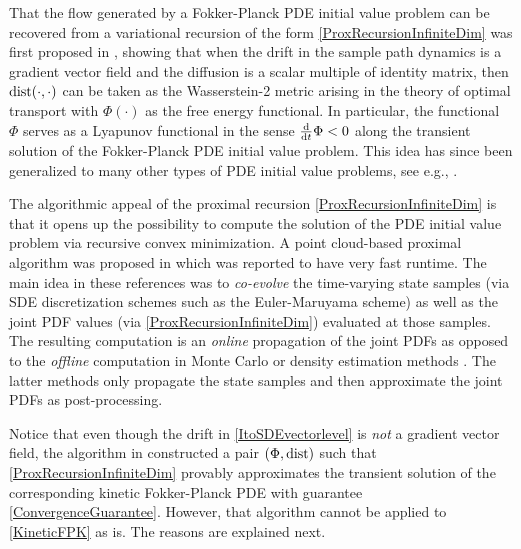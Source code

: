 \documentclass[10pt,twocolumn]{IEEEtran}
\newcommand{\differential}{{\rm{d}}}
\begin{document}
That the flow generated by a Fokker-Planck PDE initial value problem can be recovered from a variational recursion of the form \eqref{ProxRecursionInfiniteDim} was first proposed in \cite{jordan1998variational}, showing that when the drift in the sample path dynamics is a gradient vector field and the diffusion is a scalar multiple of identity matrix, then ${\rm{dist}}(\cdot,\cdot)$ can be taken as the Wasserstein-2 metric arising in the theory of optimal transport \cite{villani2003topics} with $\Phi(\cdot)$ as the free energy functional. In particular, the functional $\Phi$ serves as a Lyapunov functional in the sense $\frac{\differential}{\differential t}\Phi < 0$ along the transient solution of the Fokker-Planck PDE initial value problem. This idea has since been generalized to many other types of PDE initial value problems, see e.g., \cite{ambrosio2008gradient,santambrogio2017euclidean}. 

The algorithmic appeal of the proximal recursion \eqref{ProxRecursionInfiniteDim} is that it opens up the possibility to compute the solution of the PDE initial value problem via recursive convex minimization. A point cloud-based proximal algorithm was proposed in \cite{caluya2019ACC,caluya2019TAC} which was reported to have very fast runtime. The main idea in these references was to \emph{co-evolve} the time-varying state samples (via SDE discretization schemes such as the Euler-Maruyama scheme) as well as the joint PDF values (via \eqref{ProxRecursionInfiniteDim}) evaluated at those samples. The resulting computation is an \emph{online} propagation of the joint PDFs as opposed to the \emph{offline} computation in Monte Carlo or density estimation methods \cite{silverman1998density}. The latter methods only propagate the state samples and then approximate the joint PDFs as post-processing.

Notice that even though the drift in \eqref{ItoSDEvectorlevel} is \emph{not} a gradient vector field, the algorithm in \cite[Sec. V.B]{caluya2019TAC} constructed a pair $\left(\Phi,{\rm{dist}}\right)$ such that \eqref{ProxRecursionInfiniteDim} provably approximates the transient solution of the corresponding kinetic Fokker-Planck PDE with guarantee \eqref{ConvergenceGuarantee}. However, that algorithm cannot be applied to \eqref{KineticFPK} as is. The reasons are explained next.
\end{document}
